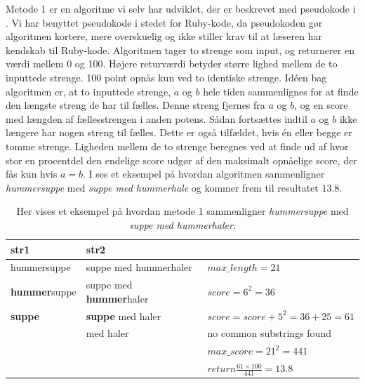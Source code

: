 Metode 1 er en algoritme vi selv har udviklet, der er beskrevet med pseudokode i . Vi har benyttet pseudokode i stedet for Ruby-kode, da pseudokoden gør algoritmen kortere, mere overskuelig og ikke stiller krav til at læseren har kendskab til Ruby-kode. Algoritmen tager to strenge som input, og returnerer en værdi mellem 0 og 100. Højere returværdi betyder større lighed mellem de to inputtede strenge. 100 point opnås kun ved to identiske strenge. Idéen bag algoritmen er, at to inputtede strenge, $a$ og $b$ hele tiden sammenlignes for at finde den længste streng de har til fælles. Denne streng fjernes fra $a$ og $b$, og en score med længden af fællesstrengen i anden potens. Sådan fortsættes indtil $a$ og $b$ ikke længere har nogen streng til fælles. Dette er også tilfældet, hvis én eller begge er tomme strenge. Ligheden mellem de to strenge beregnes ved at finde ud af hvor stor en procentdel den endelige score udgør af den maksimalt opnåelige score, der fås kun hvis $a = b$.
I  ses et eksempel på hvordan algoritmen sammenligner \textit{hummersuppe} med \textit{suppe med hummerhale} og kommer frem til resultatet $13.8$.

\begin{table}
  \center
    \begin{tabular}{|l|l|l|}
        \hline
        str1        & str2                  & ~                             \\ \hline
hummersuppe & suppe med hummerhaler & $max\_length = 21$               \\         
        \textbf{hummer}suppe & suppe med \textbf{hummer}haler & $score = 6^2 = 36$               \\ 
        \textbf{suppe}       & \textbf{suppe} med haler       & $score = score + 5^2 = 36 + 25 = 61$                 \\ 
        ~           &  med haler            & no common substrings found        \\ 
        ~           & ~                     & $max\_score = 21^2  = 441$    \\ 
        ~           & ~                     & $return \frac{61 \times 100}{441} = 13.8$ \\
        \hline
    \end{tabular}
    \caption{Her vises et eksempel på hvordan metode 1 sammenligner \textit{hummersuppe} med \textit{suppe med hummerhaler}.}
    \label{table:vores-compare-eksempel}
\end{table}

